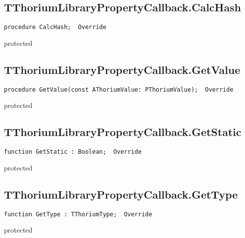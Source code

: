 \subsection{TThoriumLibraryPropertyCallback.CalcHash}
\label{thoriumcore:thorium:tthoriumlibrarypropertycallback:calchash}
\begin{FPCList}
\Synopsis
\Declaration 

\begin{verbatim}
procedure CalcHash;  Override
\end{verbatim}
\Visibility
protected
\Description
\Errors
\end{FPCList}
\subsection{TThoriumLibraryPropertyCallback.GetValue}
\label{thoriumcore:thorium:tthoriumlibrarypropertycallback:getvalue}
\begin{FPCList}
\Synopsis
\Declaration 

\begin{verbatim}
procedure GetValue(const AThoriumValue: PThoriumValue);  Override
\end{verbatim}
\Visibility
protected
\Description
\Errors
\end{FPCList}
\subsection{TThoriumLibraryPropertyCallback.GetStatic}
\label{thoriumcore:thorium:tthoriumlibrarypropertycallback:getstatic}
\begin{FPCList}
\Synopsis
\Declaration 

\begin{verbatim}
function GetStatic : Boolean;  Override
\end{verbatim}
\Visibility
protected
\Description
\Errors
\end{FPCList}
\subsection{TThoriumLibraryPropertyCallback.GetType}
\label{thoriumcore:thorium:tthoriumlibrarypropertycallback:gettype}
\begin{FPCList}
\Synopsis
\Declaration 

\begin{verbatim}
function GetType : TThoriumType;  Override
\end{verbatim}
\Visibility
protected
\Description
\Errors
\end{FPCList}
